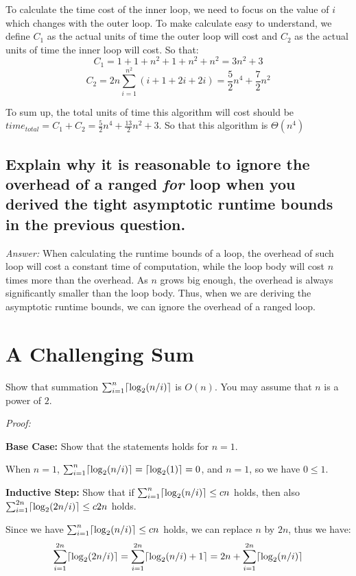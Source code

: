 \documentclass[11pt]{article}
\DeclarePairedDelimiter{\ceil}{\lceil}{\rceil}
\begin{document}
	To calculate the time cost of the inner loop, we need to focus on the value of $i$ which changes with the outer loop. To make calculate easy to understand, we define $C_1$ as the actual units of time the outer loop will cost and $C_2$ as the actual units of time the inner loop will cost. So that:
	\begin{equation*}
		C_1=1+1+n^2+1+n^2+n^2 = 3n^2+3
	\end{equation*}
	\begin{equation*}
		C_2=2n\sum_{i=1}^{n^2} (i+1+2i+2i)=\frac{5}{2} n^4 + \frac{7}{2} n^2
	\end{equation*}
	
	To sum up, the total units of time this algorithm will cost should be $time_{total} = C_1 + C_2 = \frac{5}{2}n^4+\frac{13}{2}n^2+3$. So that this algorithm is $\Theta(n^4)$
\subsection{Explain why it is reasonable to ignore the overhead of a ranged \emph{for} loop when you derived the tight asymptotic runtime bounds in the previous question.}
	\emph{Answer:} When calculating the runtime bounds of a loop, the overhead of such loop will cost a constant time of computation, while the loop body will cost $n$ times more than the overhead. As $n$ grows big enough, the overhead is always significantly smaller than the loop body. Thus, when we are deriving the asymptotic runtime bounds, we can ignore the overhead of a ranged loop.
\section{A Challenging Sum}
	Show that summation $\sum_{i=1}^{n} \ceil{\log_2(n/i)}$ is $O(n)$. You may assume that $n$ is a power of $2$.
	
	\emph{Proof:}
	
	\textbf{Base Case:} Show that the statements holds for $n=1$.
	
	When $n=1$, $\sum_{i=1}^{n} \ceil{\log_2(n/i)}=\ceil{\log_2(1)}=0$, and $n=1$, so we have $0\leq1$.
	
	\textbf{Inductive Step:} Show that if $\sum_{i=1}^{n} \ceil{\log_2(n/i)}\leq cn$ holds, then also $\sum_{i=1}^{2n} \ceil{\log_2(2n/i)}\leq c2n$ holds.
	
	Since we have $\sum_{i=1}^{n} \ceil{\log_2(n/i)}\leq cn$ holds, we can replace $n$ by $2n$, thus we have:
	\begin{equation*}
		\sum_{i=1}^{2n} \ceil{\log_2(2n/i)} = \sum_{i=1}^{2n} \ceil{\log_2(n/i)+1}=2n+\sum_{i=1}^{2n}\ceil{\log_2(n/i)}
	\end{equation*}
	
\end{document}
